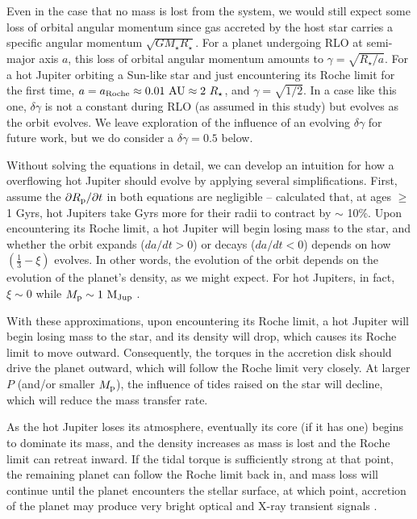 \documentclass{svjour3}                     %
\begin{document}
Even in the case that no mass is lost from the system, we would still expect some loss of orbital angular momentum since gas accreted by the host star carries a specific angular momentum $\sqrt{G M_\star R_\star}$. For a planet undergoing RLO at semi-major axis $a$, this loss of orbital angular momentum amounts to $\gamma = \sqrt{R_\star/a}$. For a hot Jupiter orbiting a Sun-like star and just encountering its Roche limit for the first time, $a = a_{\rm Roche} \approx 0.01\ {\rm AU} \approx 2\ R_\star$, and $\gamma = \sqrt{1/2}$. In a case like this one, $\delta \gamma$ is not a constant during RLO (as assumed in this study) but evolves as the orbit evolves. We leave exploration of the influence of an evolving $\delta \gamma$ for future work, but we do consider a $\delta \gamma = 0.5$ below.

Without solving the equations in detail, we can develop an intuition for how a overflowing hot Jupiter should evolve by applying several simplifications. First, assume the $\partial R_{\rm p}/\partial t$ in both equations are negligible -- \cite{Arras2006Thermal} calculated that, at ages $\geq$ 1 Gyrs, hot Jupiters take Gyrs more for their radii to contract by $\sim$ 10\%. Upon encountering its Roche limit, a hot Jupiter will begin losing mass to the star, and whether the orbit expands ($da/dt > 0$) or decays ($da/dt < 0$) depends on how $\left( \frac{1}{3} - \xi \right)$ evolves. In other words, the evolution of the orbit depends on the evolution of the planet's density, as we might expect. For hot Jupiters, in fact, $\xi \sim 0$ while $M_{\rm p} \sim 1\ {\rm M_{Jup}}$ \cite{Fortney2007Planetary}. 

With these approximations, upon encountering its Roche limit, a hot Jupiter will begin losing mass to the star, and its density will drop, which causes its Roche limit to move outward. Consequently, the torques in the accretion disk should drive the planet outward, which will follow the Roche limit very closely. At larger $P$ (and/or smaller $M_{\rm p}$), the influence of tides raised on the star will decline, which will reduce the mass transfer rate. 

As the hot Jupiter loses its atmosphere, eventually its core (if it has one) begins to dominate its mass, and the density increases as mass is lost and the Roche limit can retreat inward. If the tidal torque is sufficiently strong at that point, the remaining planet can follow the Roche limit back in, and mass loss will continue until the planet encounters the stellar surface, at which point, accretion of the planet may produce very bright optical and X-ray transient signals \cite{2012MNRAS.425.2778M}. 
\end{document}

